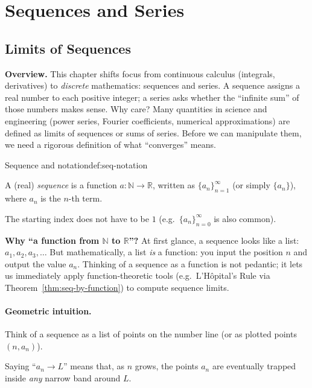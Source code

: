 \section{Sequences and Series}

\subsection{Limits of Sequences}

\textbf{Overview.}
This chapter shifts focus from continuous calculus (integrals, derivatives) to \emph{discrete} mathematics: sequences and series.
A sequence assigns a real number to each positive integer; a series asks whether the ``infinite sum'' of those numbers makes sense.
Why care?  Many quantities in science and engineering (power series, Fourier coefficients, numerical approximations) are defined as limits of sequences or sums of series.
Before we can manipulate them, we need a rigorous definition of what ``converges'' means.

\begin{definition}{Sequence and notation}{def:seq-notation}

A (real) \emph{sequence} is a function $a:\mathbb{N}\to\mathbb{R}$, written as $\{a_n\}_{n=1}^{\infty}$ (or simply $\{a_n\}$), where $a_n$ is the $n$-th term.

The starting index does not have to be $1$ (e.g.\ $\{a_n\}_{n=0}^{\infty}$ is also common).

\end{definition}

\noindent
\textbf{Why ``a function from $\mathbb{N}$ to $\mathbb{R}$''?}
At first glance, a sequence looks like a list: $a_1,a_2,a_3,\dots$
But mathematically, a list \emph{is} a function: you input the position $n$ and output the value $a_n$.
Thinking of a sequence as a function is not pedantic; it lets us immediately apply function-theoretic tools (e.g.\ L'H\^opital's Rule via Theorem~\ref{thm:seq-by-function}) to compute sequence limits.

\paragraph{Geometric intuition.}

Think of a sequence as a list of points on the number line (or as plotted points $(n,a_n)$).

Saying ``$a_n\to L$'' means that, as $n$ grows, the points $a_n$ are eventually trapped inside \emph{any} narrow band around $L$.

